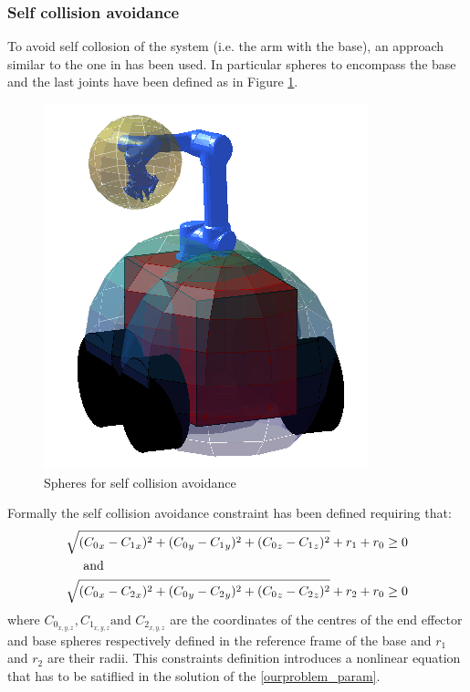 \subsubsection*{Self collision avoidance}
	To avoid self collosion of the system (i.e. the arm with the base), an approach similar to the one in \cite{sandberg1988collision} has been used. In particular spheres to encompass the base and the last joints have been defined as in Figure \ref{spheres_3d}.
	\begin{figure}[h!]
	\centering
	\includegraphics[scale=0.4]{IMMAGINI/spheres_3d.png}
	\caption{Spheres for self collision avoidance}
	\label{spheres_3d}	
	\end{figure}
	Formally the self collision avoidance constraint has been defined requiring that: 
	\begin{equation}
	\begin{split} 
		&\sqrt{({C_0}_x-{C_1}_x)^2+({C_0}_y-{C_1}_y)^2+({C_0}_z-{C_1}_z)^2} + r_1 +r_0 \geq 0 \\
		&\ \ \ \ \textnormal{and} \\
		&\sqrt{({C_0}_x-{C_2}_x)^2+({C_0}_y-{C_2}_y)^2+({C_0}_z-{C_2}_z)^2} + r_2 +r_0 \geq 0 \\
	\end{split}
	\label{spheres_const}
	\end{equation}
	where $C_0_{x,y,z},C_1_{x,y,z} \text{and }C_2_{x,y,z}$ are the coordinates of the centres of the end effector and base spheres respectively defined in the reference frame of the base and $r_1$ and $r_2$ are their radii. This constraints definition introduces a nonlinear equation that has to be satiflied in the solution of the \ref{ourproblem_param}. \\

